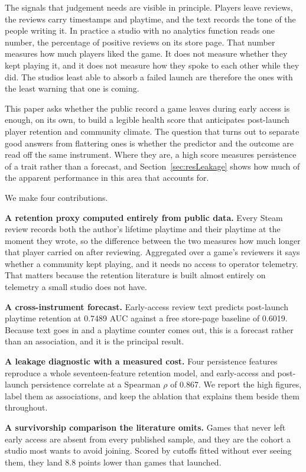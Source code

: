 \documentclass[sigconf]{acmart}
\begin{document}
The signals that judgement needs are visible in principle. Players leave reviews, the reviews carry
timestamps and playtime, and the text records the tone of the people writing it. In practice a
studio with no analytics function reads one number, the percentage of positive reviews on its store
page. That number measures how much players liked the game. It does not measure whether they kept
playing it, and it does not measure how they spoke to each other while they did. The studios least
able to absorb a failed launch are therefore the ones with the least warning that one is coming.

This paper asks whether the public record a game leaves during early access is enough, on its own,
to build a legible health score that anticipates post-launch player retention and community
climate. The question that turns out to separate good answers from flattering ones is whether the
predictor and the outcome are read off the same instrument. Where they are, a high score measures
persistence of a trait rather than a forecast, and Section~\ref{sec:resLeakage} shows how much of
the apparent performance in this area that accounts for.

We make four contributions.

\textbf{A retention proxy computed entirely from public data.} Every Steam review records both the
author's lifetime playtime and their playtime at the moment they wrote, so the difference between
the two measures how much longer that player carried on after reviewing. Aggregated over a game's
reviewers it says whether a community kept playing, and it needs no access to operator telemetry.
That matters because the retention literature is built almost entirely on telemetry a small studio
does not have.

\textbf{A cross-instrument forecast.} Early-access review text predicts post-launch playtime
retention at 0.7489 AUC against a free store-page baseline of 0.6019. Because text goes in and a
playtime counter comes out, this is a forecast rather than an association, and it is the principal
result.

\textbf{A leakage diagnostic with a measured cost.} Four persistence features reproduce a whole
seventeen-feature retention model, and early-access and post-launch persistence correlate at a
Spearman $\rho$ of 0.867. We report the high figures, label them as associations, and keep the
ablation that explains them beside them throughout.

\textbf{A survivorship comparison the literature omits.} Games that never left early access are
absent from every published sample, and they are the cohort a studio most wants to avoid joining.
Scored by cutoffs fitted without ever seeing them, they land 8.8 points lower than games that
launched.
\end{document}
